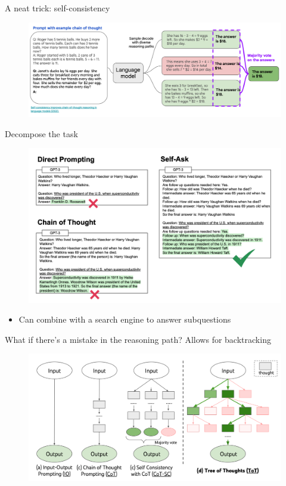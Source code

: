\documentclass[usenames,dvipsnames,notes,11pt,aspectratio=169,hyperref={colorlinks=true, linkcolor=blue}]{beamer}
\begin{document}
\begin{frame}
    {A neat trick: self-consistency}
    \begin{figure}
        \includegraphics[width=\textwidth]{figures/self-consistency}
    \end{figure}
\end{frame}

\begin{frame}
    {Decompose the task}
    \begin{figure}
        \includegraphics[width=\textwidth]{figures/self-ask}
    \end{figure}
    \begin{itemize}
        \item Can combine with a search engine to answer subquestions
    \end{itemize}
\end{frame}

\begin{frame}
    {What if there's a mistake in the reasoning path?}{}
    Allows for backtracking
    \begin{figure}
        \includegraphics[width=\textwidth]{figures/tot}
    \end{figure}
\end{frame}
\end{document}
